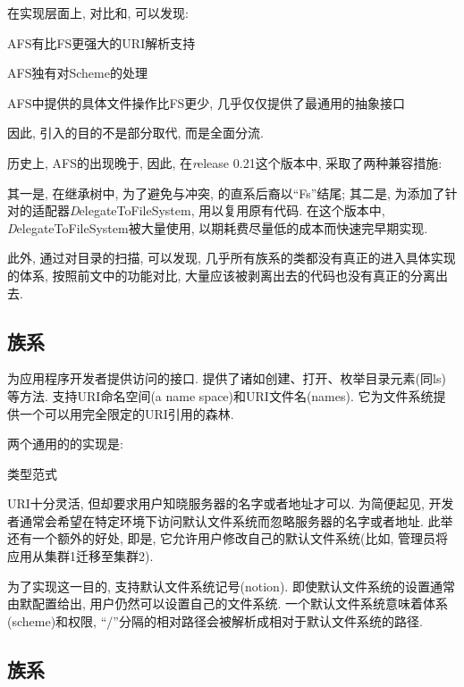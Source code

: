 在实现层面上, 对比{\AFS}和{\FS}, 可以发现:

\begin{XeEnum}
    \item AFS有比FS更强大的URI解析支持
    \item AFS独有对Scheme的处理
    \item AFS中提供的具体文件操作比FS更少, 几乎仅仅提供了最通用的抽象接口
    \item 因此, 引入{\AbsFS}的目的不是部分取代, 而是全面分流.
\end{XeEnum}

历史上, AFS的出现晚于{\FiS}, 因此, 在{\emph release 0.21}这个版本中,
采取了两种兼容措施:

其一是, 在继承树中, 为了避免与{\FiS}冲突, {\AbsFS}的直系后裔以``Fs''结尾;
其二是, 为{\AbsFS}添加了针对{\FiS}的适配器{\emph DelegateToFileSystem},
用以复用原有代码. 在这个版本中, {\emph DelegateToFileSystem}被大量使用,
以期耗费尽量低的成本而快速完早期实现.

此外, 通过对目录的扫描, 可以发现, 几乎所有{\AbsFS}族系的类都没有真正的进入具体实现的体系,
按照前文中的功能对比, 大量应该被剥离出去的代码也没有真正的分离出去.

\subsection{{\FiC}族系}
\label{ssec:hfs:fc}

{\FiC}为应用程序开发者提供访问{\HadoopFS}的接口.
{\FiC}提供了诸如创建、打开、枚举目录元素(同ls)等方法.
{\HadoopFS}支持URI命名空间(a name space)和URI文件名(names).
它为文件系统提供一个可以用完全限定的URI引用的森林.

两个通用的{\HadoopFS}的实现是:
\begin{XeDuoLineTabular}{类型}{范式}
\end{XeDuoLineTabular}

URI十分灵活, 但却要求用户知晓服务器的名字或者地址才可以.
为简便起见, 开发者通常会希望在特定环境下访问默认文件系统而忽略服务器的名字或者地址.
此举还有一个额外的好处, 即是, 它允许用户修改自己的默认文件系统(比如, 管理员将应用从集群1迁移至集群2).

为了实现这一目的, {\Hadoop}支持默认文件系统记号(notion).
即使默认文件系统的设置通常由默配置给出, 用户仍然可以设置自己的文件系统.
一个默认文件系统意味着体系(scheme)和权限, ``/''分隔的相对路径会被解析成相对于默认文件系统的路径.

\subsection{{\Shell}族系}

